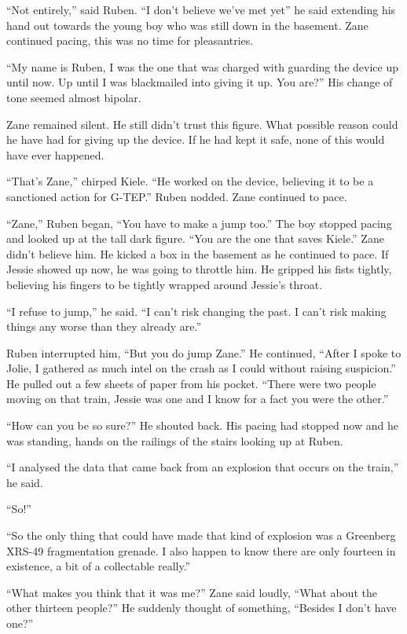 ``Not entirely,'' said Ruben.  ``I don't believe we've met yet'' he said extending his hand out towards the young boy who was still down in the basement.  Zane continued pacing, this was no time for pleasantries.  

``My name is Ruben, I was the one that was charged with guarding the device up until now.  Up until I was blackmailed into giving it up.  You are?''  His change of tone seemed almost bipolar.  

Zane remained silent.  He still didn't trust this figure.  What possible reason could he have had for giving up the device.  If he had kept it safe, none of this would have ever happened.  

``That's Zane,'' chirped Kiele.  ``He worked on the device, believing it to be a sanctioned action for G-TEP.''  Ruben nodded.  Zane continued to pace.  

``Zane,'' Ruben began, ``You have to make a jump too.''  The boy stopped pacing and looked up at the tall dark figure.  ``You are the one that saves Kiele.''  Zane didn't believe him.  He kicked a box in the basement as he continued to pace.  If Jessie showed up now, he was going to throttle him.  He gripped his fists tightly, believing his fingers to be tightly wrapped around Jessie's throat.

``I refuse to jump,'' he said.  ``I can't risk changing the past.  I can't risk making things any worse than they already are.''

Ruben interrupted him, ``But you do jump Zane.''  He continued, ``After I spoke to Jolie, I gathered as much intel on the crash as I could without raising suspicion.''  He pulled out a few sheets of paper from his pocket.  ``There were two people moving on that train, Jessie was one and I know for a fact you were the other.''

``How can you be so sure?''  He shouted back.  His pacing had stopped now and he was standing, hands on the railings of the stairs looking up at Ruben.  

``I analysed the data that came back from an explosion that occurs on the train,'' he said.

``So!''

``So the only thing that could have made that kind of explosion was a Greenberg XRS-49 fragmentation grenade.  I also happen to know there are only fourteen in existence, a bit of a collectable really.''

``What makes you think that it was me?'' Zane said loudly, ``What about the other thirteen people?''  He suddenly thought of something, ``Besides I don't have one?''

